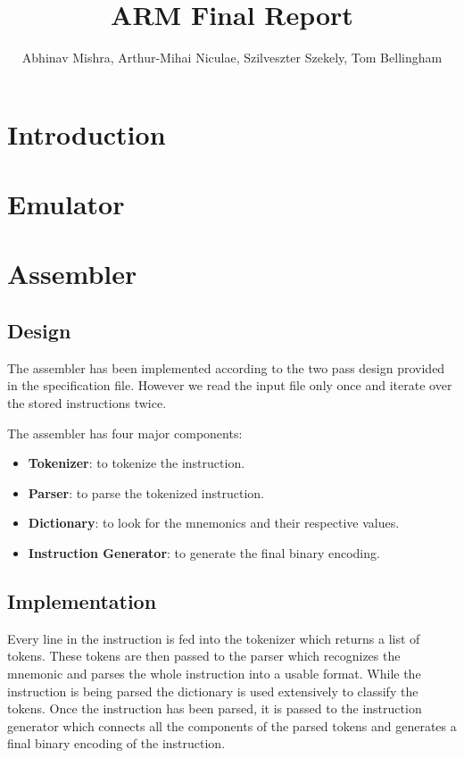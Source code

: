 \documentclass[11pt]{article}
\begin{document}
\title{ARM Final Report}
\author{
  Abhinav Mishra,
  Arthur-Mihai Niculae,
  Szilveszter Szekely,
  Tom Bellingham
}

\maketitle

\section{Introduction}

\section{Emulator}

\section{Assembler}

\subsection{Design}

The assembler has been implemented according to the two pass design provided in
the specification file. However we read the input file only once and iterate
over the stored instructions twice.

The assembler has four major components:
\begin{itemize}[noitemsep,topsep=0pt]
  \item \textbf{Tokenizer}:
    to tokenize the instruction.
  \item \textbf{Parser}:
    to parse the tokenized instruction.
  \item \textbf{Dictionary}:
    to look for the mnemonics and their respective values.
  \item \textbf{Instruction Generator}:
    to generate the final binary encoding.
\end{itemize}

\subsection{Implementation}

Every line in the instruction is fed into the tokenizer which returns a list
of tokens. These tokens are then passed to the parser which recognizes the
mnemonic and parses the whole instruction into a usable format. While the
instruction is being parsed the dictionary is used extensively to classify the
tokens. Once the instruction has been parsed, it is passed to the instruction
generator which connects all the components of the parsed tokens and generates
a final binary encoding of the instruction.
\end{document}
